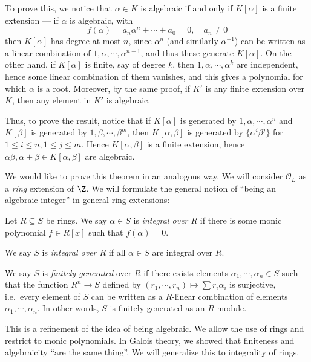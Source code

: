 \documentclass[a4paper]{article}
\begin{document}
To prove this, we notice that $\alpha \in K$ is algebraic if and only if $K[\alpha]$ is a finite extension --- if $\alpha$ is algebraic, with
\[
  f(\alpha) = a_n \alpha^n + \cdots + a_0 = 0,\quad a_n \not= 0
\]
then $K[\alpha]$ has degree at most $n$, since $\alpha^n$ (and similarly $\alpha^{-1}$) can be written as a linear combination of $1, \alpha, \cdots, \alpha^{n - 1}$, and thus these generate $K[\alpha]$. On the other hand, if $K[\alpha]$ is finite, say of degree $k$, then $1, \alpha, \cdots, \alpha^k$ are independent, hence some linear combination of them vanishes, and this gives a polynomial for which $\alpha$ is a root. Moreover, by the same proof, if $K'$ is any finite extension over $K$, then any element in $K'$ is algebraic.

Thus, to prove the result, notice that if $K[\alpha]$ is generated by $1, \alpha, \cdots, \alpha^n$ and $K[\beta]$ is generated by $1, \beta, \cdots, \beta^m$, then $K[\alpha, \beta]$ is generated by $\{\alpha^i \beta^j\}$ for $1 \leq i \leq n, 1 \leq j \leq m$. Hence $K[\alpha, \beta]$ is a finite extension, hence $\alpha\beta, \alpha \pm \beta \in K[\alpha, \beta]$ are algebraic.

We would like to prove this theorem in an analogous way. We will consider $\mathcal{O}_L$ as a \emph{ring} extension of $\Z$. We will formulate the general notion of ``being an algebraic integer'' in general ring extensions:

\begin{defi}[Integrality]
  Let $R \subseteq S$ be rings. We say $\alpha \in S$ is \emph{integral over $R$} if there is some monic polynomial $f \in R[x]$ such that $f(\alpha) = 0$.

  We say $S$ is \emph{integral over $R$} if all $\alpha \in S$ are integral over $R$.
\end{defi}

\begin{defi}
  We say $S$ is \emph{finitely-generated} over $R$ if there exists elements $\alpha_1, \cdots, \alpha_n \in S$ such that the function $R^n \to S$ defined by $(r_1, \cdots, r_n) \mapsto \sum r_i \alpha_i$ is surjective, i.e.\ every element of $S$ can be written as a $R$-linear combination of elements $\alpha_1, \cdots, \alpha_n$. In other words, $S$ is finitely-generated as an $R$-module.
\end{defi}
This is a refinement of the idea of being algebraic. We allow the use of rings and restrict to monic polynomials. In Galois theory, we showed that finiteness and algebraicity ``are the same thing''. We will generalize this to integrality of rings.
\end{document}
